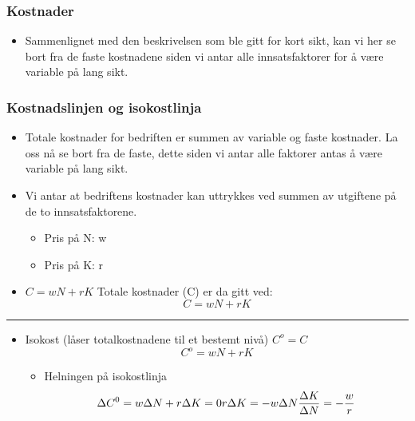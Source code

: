 \documentclass[
  letterpaper,
  DIV=11,
  numbers=noendperiod]{scrartcl}
\providecommand{\tightlist}{%
  \setlength{\itemsep}{0pt}\setlength{\parskip}{0pt}}\usepackage{longtable,booktabs,array}
\begin{document}
\subsubsection{Kostnader}\label{kostnader-1}

\begin{itemize}
\tightlist
\item
  Sammenlignet med den beskrivelsen som ble gitt for kort sikt, kan vi
  her se bort fra de faste kostnadene siden vi antar alle
  innsatsfaktorer for å være variable på lang sikt.
\end{itemize}

\subsubsection{Kostnadslinjen og
isokostlinja}\label{kostnadslinjen-og-isokostlinja}

\begin{itemize}
\tightlist
\item
  Totale kostnader for bedriften er summen av variable og faste
  kostnader. La oss nå se bort fra de faste, dette siden vi antar alle
  faktorer antas å være variable på lang sikt.
\item
  Vi antar at bedriftens kostnader kan uttrykkes ved summen av utgiftene
  på de to innsatsfaktorene.

  \begin{itemize}
  \tightlist
  \item
    Pris på N: w
  \item
    Pris på K: r
  \end{itemize}
\item
  \(C = wN + rK\) Totale kostnader (C) er da gitt ved: \[
  C = wN  +  rK
  \]
\end{itemize}

\begin{center}\rule{0.5\linewidth}{0.5pt}\end{center}

\begin{itemize}
\tightlist
\item
  Isokost (låser totalkostnadene til et bestemt nivå) \(C^o=C\) \[
  C^o= wN + rK
  \]

  \begin{itemize}
  \tightlist
  \item
    Helningen på isokostlinja \begin{equation}
    \Delta C^0= w\Delta N + r\Delta K = 0 \\
     r\Delta K = -w\Delta N  \\
    \frac{\Delta K}{\Delta N} = - \frac{w}{r} 
    \end{equation}
  \end{itemize}
\end{itemize}
\end{document}
